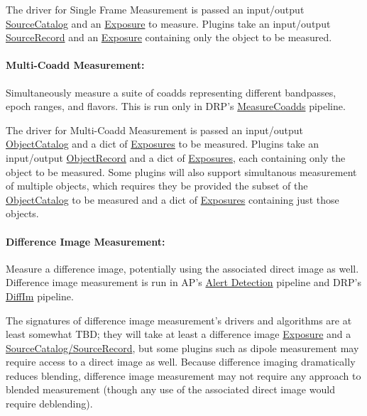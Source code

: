 The driver for Single Frame Measurement is passed an input/output \hyperref[sec:spTablesSource]{SourceCatalog} and an \hyperref[sec:spImagesExposure]{Exposure} to measure.  Plugins take an input/output \hyperref[sec:spTablesSource]{SourceRecord} and an \hyperref[sec:spImagesExposure]{Exposure} containing only the object to be measured.

\paragraph{Multi-Coadd Measurement:} Simultaneously measure a suite of coadds representing different bandpasses, epoch ranges, and flavors.  This is run only in DRP's \hyperref[sec:drpMeasureCoadds]{MeasureCoadds} pipeline.
\label{sec:acMultiCoaddMeasurement}

The driver for Multi-Coadd Measurement is passed an input/output \hyperref[sec:spTablesObject]{ObjectCatalog} and a dict of \hyperref[sec:spImagesExposure]{Exposures} to be measured.  Plugins take an input/output \hyperref[sec:spTablesObject]{ObjectRecord} and a dict of \hyperref[sec:spImagesExposure]{Exposures}, each containing only the object to be measured.  Some plugins will also support simultanous measurement of multiple objects, which requires they be provided the subset of the \hyperref[sec:spTablesObject]{ObjectCatalog} to be measured and a dict of \hyperref[sec:spImagesExposure]{Exposures} containing just those objects.

\paragraph{Difference Image Measurement:} Measure a difference image, potentially using the associated direct image as well.  Difference image measurement is run in AP's \hyperref[sec:apAlertDetection]{Alert Detection} pipeline and DRP's \hyperref[sec:drpDiffIm]{DiffIm} pipeline.
\label{sec:acDiffImMeasurement}

The signatures of difference image measurement's drivers and algorithms are at least somewhat TBD; they will take at least a difference image \hyperref[sec:spImagesExposure]{Exposure} and a \hyperref[sec:spTablesSource]{SourceCatalog/SourceRecord}, but some plugins such as dipole measurement may require access to a direct image as well.  Because difference imaging dramatically reduces blending, difference image measurement may not require any approach to blended measurement (though any use of the associated direct image would require deblending).

